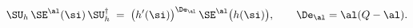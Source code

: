 \begin{equation}\label{Evir}
\SU_h\,\SE^{\al}(\si)\,\SU^{\dagger}_h\;=\;\bigl(
h'(\si) %
\bigr)^{\De_{\al}}\,\SE^{\al}\big(h(\si)\big),\qquad
\De_{\al}=\al(Q-\al).
\end{equation}

